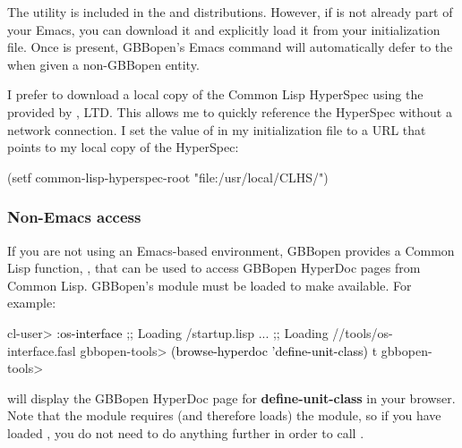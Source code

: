 \documentclass[10pt,twoside,english,pdftex]{article}
\begin{document}
The
utility is included in the
 and
 distributions.
However, if  is not already part of your Emacs, you
can download it and explicitly load it from your  initialization
file.  Once  is present, GBBopen's
 Emacs command will automatically defer to the
 when given a
non-GBBopen entity.

I prefer to download a local copy of the Common Lisp HyperSpec using the
provided by , LTD.  This allows
me to quickly reference the HyperSpec without a network connection.  I set the
value of  in my 
initialization file to a URL that points to my local copy of the HyperSpec:
%
\W\supp
\begin{example}
  (setf common-lisp-hyperspec-root "file:/usr/local/CLHS/")
\end{example}

\subsubsection*{Non-Emacs access}

%
If you are not using an Emacs-based environment, GBBopen provides a Common
Lisp function, , that can be used to access
GBBopen HyperDoc pages from Common Lisp.  GBBopen's
 module must be loaded to make
 available.  For example:
%
\W\supp
\begin{smallexample}
\textcolor{darkergray}{%
  cl-user> \textcolor{black}{:os-interface}
  ;; Loading /startup.lisp
     ...
  ;; Loading //tools/os-interface.fasl
  gbbopen-tools> \textcolor{black}{(browse-hyperdoc 'define-unit-class)}
  t
  gbbopen-tools>}
\end{smallexample}
%
will display the GBBopen HyperDoc page for \textbf{define-unit-class} in your
browser.  Note that the  module requires (and
therefore loads) the  module, so if you have loaded
, you do not need to do anything further in order
to call .
\end{document}
